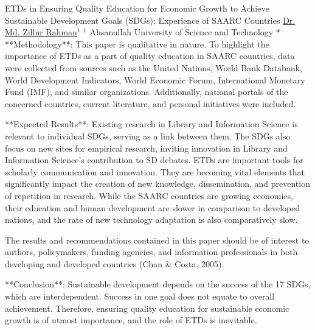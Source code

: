 \begin{abstract_online}{ETDs in Ensuring Quality Education for Economic Growth to Achieve Sustainable Development Goals (SDGs): Experience of SAARC Countries}{%
    \underline{Dr. Md. Zillur Rahman}$^{1}$}{%
    }{%
    $^1$ Ahsanullah University of Science and Technology *\newline{}
}
**Methodology**: This paper is qualitative in nature. To highlight the importance of ETDs as a part of quality education in SAARC countries, data were collected from sources such as the United Nations, World Bank Databank, World Development Indicators, World Economic Forum, International Monetary Fund (IMF), and similar organizations. Additionally, national portals of the concerned countries, current literature, and personal initiatives were included.

**Expected Results**: Existing research in Library and Information Science is relevant to individual SDGs, serving as a link between them. The SDGs also focus on new sites for empirical research, inviting innovation in Library and Information Science's contribution to SD debates. ETDs are important tools for scholarly communication and innovation. They are becoming vital elements that significantly impact the creation of new knowledge, dissemination, and prevention of repetition in research. While the SAARC countries are growing economies, their education and human development are slower in comparison to developed nations, and the rate of new technology adaptation is also comparatively slow.

The results and recommendations contained in this paper should be of interest to authors, policymakers, funding agencies, and information professionals in both developing and developed countries (Chan & Costa, 2005).

**Conclusion**: Sustainable development depends on the success of the 17 SDGs, which are interdependent. Success in one goal does not equate to overall achievement. Therefore, ensuring quality education for sustainable economic growth is of utmost importance, and the role of ETDs is inevitable.

\end{abstract_online}

